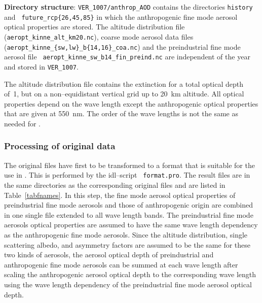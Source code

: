 \begin{appendix}
{\bf Directory structure}: 
{\tt VER\_1007/anthrop\_AOD} contains the directories {\tt history}
and {\tt
  future\_rcp\{26,45,85\}} in which the anthropogenic fine mode
aerosol optical properties are stored. The altitude distribution file\newline
({\tt aeropt\_kinne\_alt\_km20.nc}), coarse mode aerosol data files
({\tt aeropt\_kinne\_\{sw,lw\}\_b\{14,16\}\_coa.nc}) and the
preindustrial fine mode aerosol file {\tt
  aeropt\_kinne\_sw\_b14\_fin\_preind.nc} are independent of the year
and stored in {\tt VER\_1007}. 

The altitude distribution file contains the extinction for a total
optical depth of~1, but on a non--equidistant vertical grid up to
20~km altitude. All optical properties depend on the wave length except
the anthropogenic optical properties that are given at 550~nm. The
order of the wave lengths is not the same as needed for \echam. 

\subsubsection{Processing of original data}

The original files have first to be transformed to a format that is
suitable for the use in \echam. This is performed by the idl--script {\tt
  format.pro}. The result files are in the same directories as the
corresponding original files and are listed in Table~\ref{tabfnames}.
In this step, the fine mode aerosol optical properties of
preindustrial fine mode aerosols and those of anthropogenic origin
are combined in one single file extended to all wave length bands.
The preindustrial fine mode aerosols optical properties are assumed to
have the same wave length dependency as the anthropogenic fine mode
aerosols. Since the altitude distribution, single scattering albedo,
and asymmetry factors are assumed to be the same for these two kinds
of aerosols, the aerosol optical
depth of preindustrial and anthropogenic fine mode aerosols can be
summed at each wave length after scaling the anthropogenic aerosol
optical depth to
the corresponding wave length using the wave length dependency of the
preindustrial fine mode aerosol optical depth.


\end{appendix}
